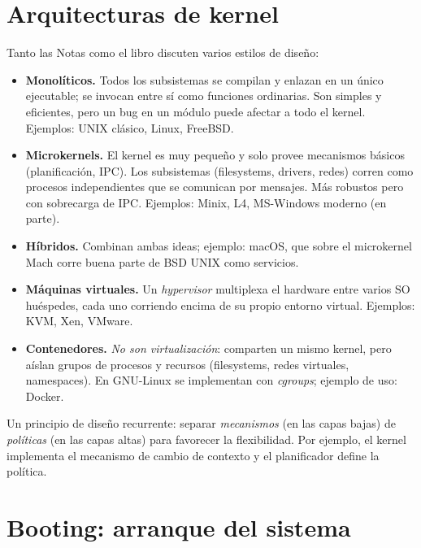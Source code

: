 \documentclass[11pt,a4paper]{article}
\begin{document}
\section{Arquitecturas de kernel}

Tanto las Notas como el libro discuten varios estilos de diseño:

\begin{itemize}[leftmargin=*]
    \item \textbf{Monolíticos.} Todos los subsistemas se compilan y
        enlazan en un único ejecutable; se invocan entre sí como
        funciones ordinarias. Son simples y eficientes, pero un bug en
        un módulo puede afectar a todo el kernel. Ejemplos:
        UNIX clásico, Linux, FreeBSD.
    \item \textbf{Microkernels.} El kernel es muy pequeño y solo provee
        mecanismos básicos (planificación, IPC). Los subsistemas
        (filesystems, drivers, redes) corren como procesos
        independientes que se comunican por mensajes. Más robustos
        pero con sobrecarga de IPC. Ejemplos: Minix, L4, MS-Windows
        moderno (en parte).
    \item \textbf{Híbridos.} Combinan ambas ideas; ejemplo: macOS, que
        sobre el microkernel Mach corre buena parte de BSD UNIX como
        servicios.
    \item \textbf{Máquinas virtuales.} Un \emph{hypervisor} multiplexa
        el hardware entre varios SO huéspedes, cada uno corriendo
        encima de su propio entorno virtual. Ejemplos: KVM,
        Xen, VMware.
    \item \textbf{Contenedores.} \emph{No son virtualización}: comparten
        un mismo kernel, pero aíslan grupos de procesos y recursos
        (filesystems, redes virtuales, namespaces). En GNU-Linux se
        implementan con \emph{cgroups}; ejemplo de uso: Docker.
\end{itemize}

Un principio de diseño recurrente: separar \emph{mecanismos} (en las
capas bajas) de \emph{políticas} (en las capas altas) para favorecer la
flexibilidad. Por ejemplo, el kernel implementa el mecanismo de cambio
de contexto y el planificador define la política.

\section{Booting: arranque del sistema}
\end{document}
